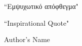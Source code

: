 \vspace*{7cm}

\begin{center}
\begin{minipage}{0.5\textwidth}
\centering

``Εμψυχωτικό απόφθεγμα"

\vspace{2cm}

``Inspirational Quote"

\vspace{2cm}

Author's Name

\end{minipage}
\end{center}
